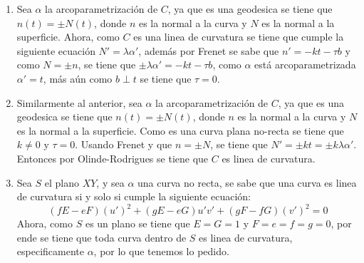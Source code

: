 \documentclass{homework}
\begin{document}
\begin{sol}
    \begin{enumerate}
        \item Sea \(\alpha\) la arcoparametrización de \(C\), ya que es una geodesica se tiene que \(n(t)=\pm N(t)\), donde \(n\) es la normal a la curva y \(N\) es la normal a la superficie. Ahora, como \(C\) es una linea de curvatura se tiene que cumple la siguiente ecuación \(N'=\lambda\alpha'\), además por Frenet se sabe que \(n'=-kt-\tau b\) y como \(N=\pm n\), se tiene que \(\pm\lambda\alpha'=-kt-\tau b\), como \(\alpha\) está arcoparametrizada \(\alpha'=t\), más aún como \(b\perp t\) se tiene que \(\tau=0\).
        \item Similarmente al anterior, sea \(\alpha\) la arcoparametrización de \(C\), ya que es una geodesica se tiene que \(n(t)=\pm N(t)\), donde \(n\) es la normal a la curva y \(N\) es la normal a la superficie. Como es una curva plana no-recta se tiene que \(k\neq 0\) y \(\tau=0\). Usando Frenet y que \(n=\pm N\), se tiene que \(N'=\pm kt=\pm k\lambda\alpha'\).  Entonces por Olinde-Rodrigues se tiene que \(C\) es linea de curvatura.
        \item Sea \(S\) el plano \(XY\), y sea \(\alpha\) una curva no recta, se sabe que una curva es linea de curvatura si y solo si cumple la siguiente ecuación:
        \begin{equation*}
            (fE-eF)(u')^2+(gE-eG)u'v'+(gF-fG)(v')^2=0
        \end{equation*}
        Ahora, como \(S\) es un plano se tiene que \(E=G=1\) y \(F=e=f=g=0\), por ende se tiene que toda curva dentro de \(S\) es linea de curvatura, especificamente \(\alpha\), por lo que tenemos lo pedido.
    \end{enumerate}
\end{sol}

\begin{sol}

\end{sol}
\end{document}
